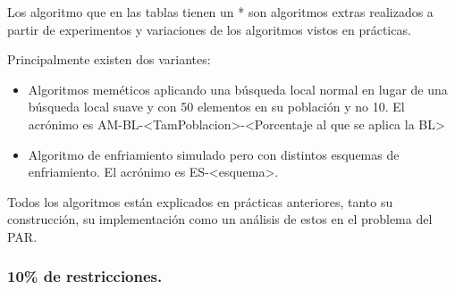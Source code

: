 \documentclass[12pt, spanish]{article}
\begin{document}
Los algoritmo que en las tablas tienen un * son algoritmos extras realizados a partir de experimentos y variaciones de los algoritmos vistos en prácticas.

Principalmente existen dos variantes:

\begin{itemize}
	\item Algoritmos meméticos aplicando una búsqueda local normal en lugar de una búsqueda local suave y con 50 elementos en su población y no 10. El acrónimo es AM-BL-<TamPoblacion>-<Porcentaje al que se aplica la BL>
	\item Algoritmo de enfriamiento simulado pero con distintos esquemas de enfriamiento. El acrónimo es ES-<esquema>.
\end{itemize}

Todos los algoritmos están explicados en prácticas anteriores, tanto su construcción, su implementación como un análisis de estos en el problema del PAR.


\subsubsection{10\% de restricciones.}
\end{document}
